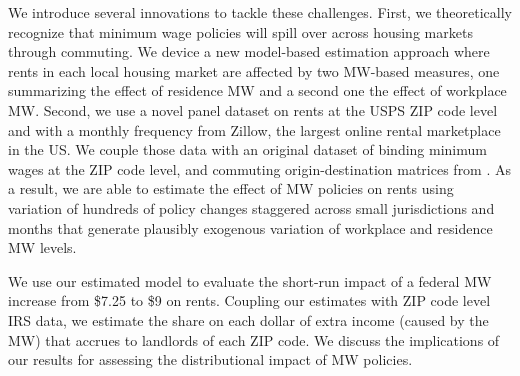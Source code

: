 
We introduce several innovations to tackle these challenges.
First, we theoretically recognize that minimum wage policies will spill over across
housing markets through commuting.
We device a new model-based estimation approach where rents in each local housing 
market are affected by two MW-based measures, one summarizing the effect of 
residence MW and a second one the effect of workplace MW.
Second, we use a novel panel dataset on rents at the USPS ZIP code level and with 
a monthly frequency from Zillow, the largest online rental marketplace in the US.
We couple those data with an original dataset of binding minimum wages at the
ZIP code level, and commuting origin-destination matrices from \textcite{LODES}.
As a result, we are able to estimate the effect of MW policies on rents using 
variation of hundreds of policy changes staggered across small jurisdictions and 
months that generate plausibly exogenous variation of workplace and residence MW
levels.

We use our estimated model to evaluate the short-run impact of a federal MW 
increase from \$7.25 to \$9 on rents.
Coupling our estimates with ZIP code level IRS data, we estimate the share on each 
dollar of extra income (caused by the MW) that accrues to landlords of each ZIP code.
We discuss the implications of our results for assessing the distributional 
impact of MW policies.


